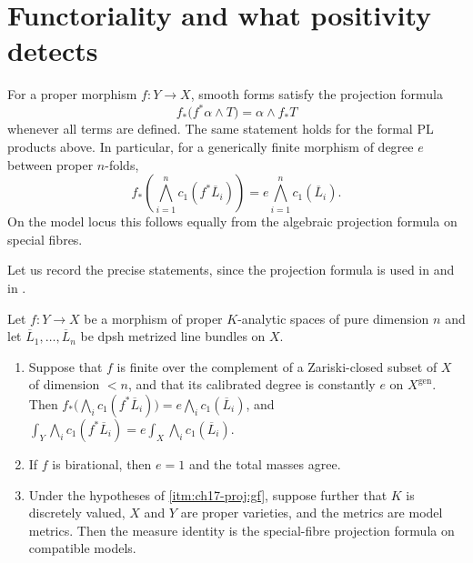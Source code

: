 \section{Functoriality and what positivity detects}
\label{sec:ch17-functoriality}

For a proper morphism $f:Y\to X$, smooth forms satisfy the projection
formula
\[
       f_*\bigl(f^*\alpha\wedge T\bigr)=\alpha\wedge f_*T
\]
whenever all terms are defined.  The same statement holds for the formal PL
products above.  In particular, for a generically finite morphism of degree
$e$ between proper $n$-folds,
\[
 f_*\!\left(\bigwedge_{i=1}^n c_1(f^*\overline L_i)\right)
      =e\bigwedge_{i=1}^n c_1(\overline L_i).
\]
On the model locus this follows equally from the algebraic projection
formula on special fibres.

Let us record the precise statements, since the projection formula is used
in  and in .

\begin{proposition}
\label{prop:ch17-projection}
Let $f:Y\to X$ be a morphism of proper $K$-analytic spaces of pure
dimension $n$ and let $\overline L_1,\dots,\overline L_n$ be dpsh
metrized line bundles on $X$.
\begin{enumerate}
\item\label{itm:ch17-proj:gf}
 Suppose that $f$ is finite over the complement of a Zariski-closed
 subset of $X$ of dimension $<n$, and that its calibrated degree is
 constantly $e$ on $X^{\mathrm{gen}}$.  Then
 $f_*\bigl(\bigwedge_ic_1(f^*\overline L_i)\bigr)
   =e\bigwedge_ic_1(\overline L_i)$, and
 $\int_Y\bigwedge_ic_1(f^*\overline L_i)
   =e\int_X\bigwedge_ic_1(\overline L_i)$.
\item\label{itm:ch17-proj:bir}
 If $f$ is birational, then $e=1$ and the total masses agree.
\item\label{itm:ch17-proj:model}
 Under the hypotheses of \cref{itm:ch17-proj:gf}, suppose further that
 $K$ is discretely valued, $X$ and $Y$ are proper varieties, and the
 metrics are model metrics.  Then the measure identity is the
 special-fibre projection formula on compatible models.
\end{enumerate}
\end{proposition}

